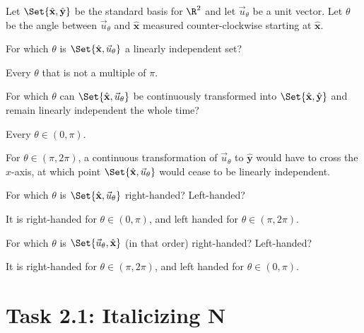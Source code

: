 \documentclass{problemset}
\newcommand{\xhat}{{\hat {\mathbf x}}}
\newcommand{\yhat}{{\hat {\mathbf y}}}
\begin{document}
	\question
	Let $\Set{\xhat,\yhat}$ be the standard basis for $\R^2$ and let
	$\vec u_{\theta}$ be a unit vector. Let $\theta$ be the angle between $\vec u_{\theta}$ and
	$\xhat$ measured counter-clockwise starting at $\xhat$.
	\begin{parts}
		\item For which $\theta$ is $\Set{\xhat,\vec u_{\theta}}$ a linearly independent set?
			\begin{solution}[inline]
				Every $\theta$ that is not a multiple of $\pi$. 
			\end{solution}
		\item For which $\theta$ can $\Set{\xhat,\vec u_{\theta}}$ be continuously
			transformed into $\Set{\xhat,\yhat}$ and remain linearly independent the
			whole time?
			\begin{solution}
				Every $\theta \in (0, \pi)$. 

				For $\theta\in(\pi,2\pi)$, a continuous transformation of 
				$\vec u_\theta$	to $\yhat$ would have to cross the $x$-axis,
				at which point $\Set{\xhat,\vec u_\theta}$ would cease to be 
				linearly independent. 
			\end{solution}
		\item For which $\theta$ is $\Set{\xhat,\vec u_{\theta}}$ right-handed?	
			Left-handed?
			\begin{solution}
				It is right-handed for $\theta\in(0, \pi)$, and left handed for
				$\theta\in(\pi,2\pi)$.
			\end{solution}
		\item For which $\theta$ is $\Set{\vec u_{\theta},\xhat}$ (in that order) 
			right-handed? Left-handed?
			\begin{solution}
				It is right-handed for $\theta\in(\pi,2\pi)$, and left handed
				for $\theta\in(0,\pi)$.
			\end{solution}
	\end{parts}


\newpage
\pagestyle{iola}
\section*{Task 2.1: Italicizing N}
\end{document}
